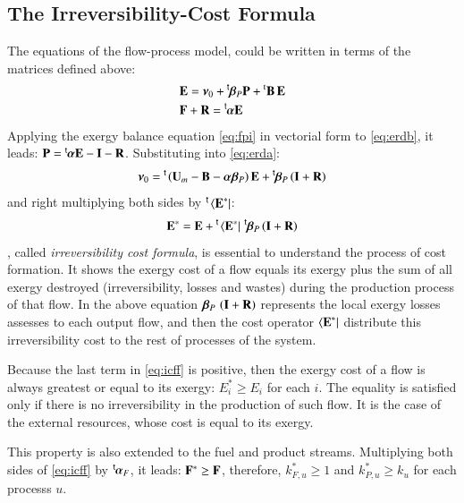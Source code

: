 \documentclass{ecos2018}
\begin{document}
\subsection{The Irreversibility-Cost Formula}
The equations of the flow-process model, could be written in terms of the matrices defined above:
\begin{align}
&\mathbf{E}=\bm{\nu}_0+\prescript{\smash{\mathsf{t}}}{}{\mskip-1mu}\bm{\beta}_P\mathbf{P}+\prescript{\smash{\mathrm{t}}}{}{\mathbf{B}}\,\mathbf{E} \label{eq:erda}\\
&\mathbf{F}+\mathbf{R}=\prescript{\smash{\mathsf{t}}}{}{\mskip-1mu}\bm{\alpha}\mathbf{E} \label{eq:erdb}
\end{align}
Applying the exergy balance equation \cref{eq:fpi} in vectorial form to \cref{eq:erdb}, it leads: ${\mathbf{P}=\prescript{\smash{\mathsf{t}}}{}{\mskip-1mu}\bm{\alpha}\mathbf{E}-\mathbf{I}-\mathbf{R}}$. Substituting into \cref{eq:erda}:
\begin{equation}
\bm{\nu}_0=\prescript{\smash{\mathsf{t}}}{}{\mskip-1mu}\left(\mathbf{U}_m-\mathbf{B}-\bm{\alpha}\bm{\beta}_P\right)\mathbf{E}+\prescript{\smash{\mathsf{t}}}{}{\mskip-1mu}\bm{\beta}_P\left(\mathbf{I}+\mathbf{R}\right)
\end{equation}
and right multiplying both sides by $\prescript{\smash{\mathsf{t}}}{}{\mskip-1mu}\left\langle {\textbf{E}^\ast } \right|$:
\begin{equation}
\label{eq:icff}
\mathbf{E}^*=\mathbf{E}+\prescript{\smash{\mathsf{t}}}{}{\mskip-1mu}\left\langle {\textbf{E}^\ast } \right|\,\prescript{\smash{\mathsf{t}}}{}{\mskip-1mu}\bm{\beta}_P\left(\mathbf{I}+\mathbf{R}\right)
\end{equation}
, called \emph{irreversibility cost formula}, is essential to understand the process of cost formation. It shows the exergy cost of a flow equals its exergy plus the sum of all exergy destroyed (irreversibility, losses and wastes) during the production process of that flow. In the above equation $\bm{\beta}_P\,\left(\mathbf{I}+\mathbf{R}\right)$ represents the local exergy losses assesses to each output flow, and then the cost operator $\left\langle {\textbf{E}^\ast } \right|$  distribute this irreversibility cost to the rest of processes of the system.

Because the last term in \cref{eq:icff} is  positive, then the exergy cost of a flow is always greatest or equal to its exergy: $E_i^* \ge E_i$ for each $i$. The equality is satisfied only if there is no irreversibility in the production of such flow. It is the case of the external resources, whose cost is equal to its exergy.

This property is also extended to the fuel and product streams. Multiplying both sides of \cref{eq:icff} by $\prescript{\smash{\mathsf{t}}}{}{\mskip-1mu}\bm{\alpha}_F$, it leads: $\mathbf{F}^*\ge\mathbf{F}$, therefore, {$k_{F,u}^{*}\ge 1$} and {$k_{P,u}^{*}\ge k_u$} for each processs $u$.
\end{document}

